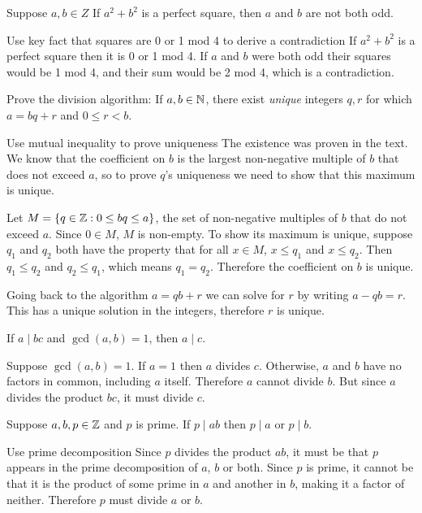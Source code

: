 \documentclass{article}
\begin{document}
\begin{problem}
Suppose $a, b \in Z$ If $a^2 + b^2$ is a perfect square, then $a$ and $b$ are not both odd.
\end{problem}
\begin{solution}{Use key fact that squares are 0 or 1 mod 4 to derive a contradiction}
  If $a^2 + b^2$ is a perfect square then it is 0 or 1 mod 4. If $a$ and $b$ were both odd their squares would be 1 mod 4, and their sum would be 2 mod 4, which is a contradiction.
\end{solution}

\begin{problem}
Prove the division algorithm: If $a, b \in \mathbb{N}$, there exist \textit{unique} integers $q, r$ for which $a = bq + r$ and $0 \leq r < b$.
\end{problem}
\begin{solution}{Use mutual inequality to prove uniqueness}
  The existence was proven in the text. We know that the coefficient on $b$ is the largest non-negative multiple of $b$ that does not exceed $a$, so to prove $q$'s uniqueness we need to show that this maximum is unique.

  Let $M = \{q \in \mathbb{Z}: 0 \leq bq \leq a \}$, the set of non-negative multiples of $b$ that do not exceed $a$. Since $0 \in M$, $M$ is non-empty. To show its maximum is unique, suppose $q_1$ and $q_2$ both have the property that for all $x \in M$, $x \leq q_1$ and $x \leq q_2$. Then $q_1 \leq q_2$ and $q_2 \leq q_1$, which means $q_1 = q_2$. Therefore the coefficient on $b$ is unique.

  Going back to the algorithm $a = qb + r$ we can solve for $r$ by writing $a - qb = r$. This has a unique solution in the integers, therefore $r$ is unique.
\end{solution}

\begin{problem}
If $a \mid bc$ and $\gcd(a, b) = 1$, then $a \mid c$.
\end{problem}
\begin{solution}{}
  Suppose $\gcd(a,b) = 1$. If $a = 1$ then $a$ divides $c$. Otherwise, $a$ and $b$ have no factors in common, including $a$ itself. Therefore $a$ cannot divide $b$. But since $a$ divides the product $bc$, it must divide $c$.
\end{solution}

\begin{problem}
Suppose $a, b, p \in \mathbb{Z}$ and $p$ is prime. If $p \mid ab$ then $p \mid a$ or $p \mid b$.
\end{problem}
\begin{solution}{Use prime decomposition}
  Since $p$ divides the product $ab$, it must be that $p$ appears in the prime decomposition of $a$, $b$ or both. Since $p$ is prime, it cannot be that it is the product of some prime in $a$ and another in $b$, making it a factor of neither. Therefore $p$ must divide $a$ or $b$.
\end{solution}
\end{document}
